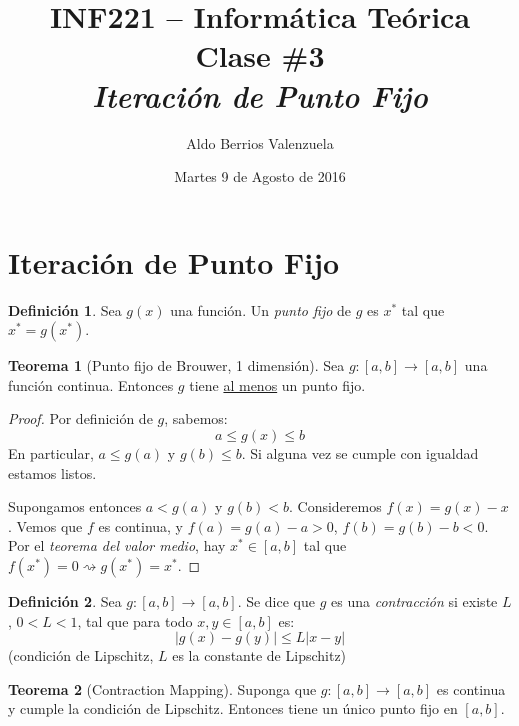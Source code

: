 \documentclass[english, spanish, fleqn, 10pt]{article}
\author{Aldo Berrios Valenzuela}
\title{INF221 -- Informática Teórica\\[.4\baselineskip]Clase \#3\\\textit{Iteración de Punto Fijo}}
\date{Martes 9 de Agosto de 2016}
\numberwithin{equation}{section}
\newcommand{\nparentesis}[1]{\left( #1 \right)}
\newcommand{\nabsoluto}[1]{\left| #1 \right|}
\newcommand{\ncorchetes}[1]{\left[ #1 \right]}
\theoremstyle{definition}
\newtheorem{teorema}{Teorema}[section]
\newtheorem{definition}{Definición}[section]
\begin{document}
\maketitle
\section{Iteración de Punto Fijo}
\begin{definition}
	Sea $g\nparentesis{x}$ una función. Un \emph{punto fijo} de $g$ es $x^*$ tal que $x^*=g\nparentesis{x^*}$.
\end{definition}

\begin{teorema}[Punto fijo de Brouwer, 1 dimensión]
	Sea $g:\ncorchetes{a, b}\rightarrow\ncorchetes{a, b}$ una función continua. Entonces $g$ tiene \underline{al menos} un punto fijo.
\end{teorema}
\begin{proof}
	Por definición de $g$, sabemos:
	\begin{equation*}
	a\leq g\nparentesis{x} \leq b
	\end{equation*}
	En particular, $a\leq g\nparentesis{a}$ y $g\nparentesis{b}\leq b$. Si alguna vez se cumple con igualdad estamos listos.
	
	Supongamos entonces $a<g\nparentesis{a}$ y $g\nparentesis{b}<b$. Consideremos $f\nparentesis{x}=g\nparentesis{x}-x$. Vemos que $f$ es continua, y $f\nparentesis{a}=g\nparentesis{a}-a>0$, $f\nparentesis{b}=g\nparentesis{b}-b<0$. Por el \textit{teorema del valor medio}, hay $x^*\in\ncorchetes{a, b}$ tal que $f\nparentesis{x^*}=0\rightsquigarrow g\nparentesis{x^*}=x^*$.
\end{proof}

\begin{definition}
	Sea $g:\ncorchetes{a, b}\rightarrow \ncorchetes{a, b}$. Se dice que $g$ es una \emph{contracción} si existe $L$, $0<L<1$, tal que para todo $x, y\in\ncorchetes{a, b}$ es:
	\begin{equation}
	\nabsoluto{g\nparentesis{x}-g\nparentesis{y}}\leq L\nabsoluto{x-y}
	\end{equation}
	(condición de Lipschitz, $L$ es la constante de Lipschitz)
\end{definition}

\begin{teorema}[Contraction Mapping]
	Suponga que $g:\ncorchetes{a, b}\rightarrow \ncorchetes{a, b}$ es continua y cumple la condición de Lipschitz. Entonces tiene un único punto fijo en $\ncorchetes{a, b}$.
\end{teorema}
\end{document}
